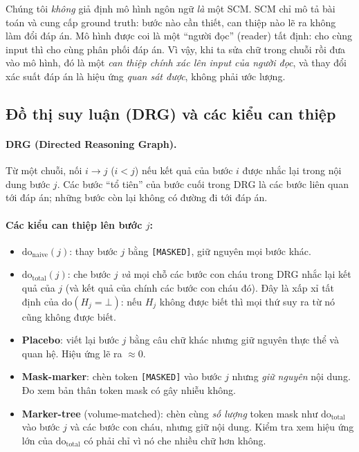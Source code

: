 \documentclass[11pt]{article}
\newcommand{\dn}{\mathrm{do}_{\text{naive}}}
\newcommand{\dt}{\mathrm{do}_{\text{total}}}
\begin{document}
\begin{thietke}
Chúng tôi \emph{không} giả định mô hình ngôn ngữ \emph{là} một SCM. SCM chỉ mô tả bài toán và cung
cấp ground truth: bước nào cần thiết, can thiệp nào lẽ ra không làm đổi đáp án. Mô hình được coi
là một ``người đọc'' (reader) tất định: cho cùng input thì cho cùng phân phối đáp án. Vì vậy, khi
ta sửa chữ trong chuỗi rồi đưa vào mô hình, đó là một \emph{can thiệp chính xác lên input của
người đọc}, và thay đổi xác suất đáp án là hiệu ứng \emph{quan sát được}, không phải ước lượng.
\end{thietke}

\subsection{Đồ thị suy luận (DRG) và các kiểu can thiệp}

\paragraph{DRG (Directed Reasoning Graph).} Từ một chuỗi, nối $i\to j$ ($i<j$) nếu kết quả của
bước $i$ được nhắc lại trong nội dung bước $j$. Các bước ``tổ tiên'' của bước cuối trong DRG là
các bước liên quan tới đáp án; những bước còn lại không có đường đi tới đáp án.

\paragraph{Các kiểu can thiệp lên bước $j$:}
\begin{itemize}[leftmargin=*,itemsep=1pt]
\item $\dn(j)$: thay bước $j$ bằng \texttt{[MASKED]}, giữ nguyên mọi bước khác.
\item $\dt(j)$: che bước $j$ \emph{và} mọi chỗ các bước con cháu trong DRG nhắc lại kết quả của
  $j$ (và kết quả của chính các bước con cháu đó). Đây là xấp xỉ tất định của
  $\mathrm{do}(H_j=\bot)$: nếu $H_j$ không được biết thì mọi thứ suy ra từ nó cũng không được biết.
\item \textbf{Placebo}: viết lại bước $j$ bằng câu chữ khác nhưng giữ nguyên thực thể và quan hệ.
  Hiệu ứng lẽ ra $\approx 0$.
\item \textbf{Mask-marker}: chèn token \texttt{[MASKED]} vào bước $j$ nhưng \emph{giữ nguyên} nội
  dung. Đo xem bản thân token mask có gây nhiễu không.
\item \textbf{Marker-tree} (volume-matched): chèn cùng \emph{số lượng} token mask như $\dt$ vào
  bước $j$ và các bước con cháu, nhưng giữ nội dung. Kiểm tra xem hiệu ứng lớn của $\dt$ có phải
  chỉ vì nó che nhiều chữ hơn không.
\end{itemize}
\end{document}
